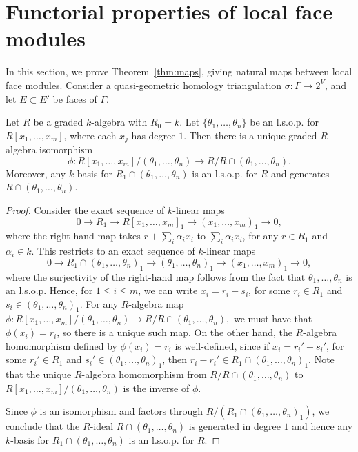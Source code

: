 \documentclass[ALCO, Unicode,published]{cedram}
\begin{document}
\section{Functorial properties of local face modules}

In this section, we prove Theorem~\ref{thm:maps}, giving natural maps between local face modules.  
Consider a quasi-geometric homology triangulation $\sigma\colon \Gamma \to 2^V$, and let $E \subset E'$ be faces of $\Gamma$.




\begin{lemma}\label{lemma:lsop}
Let $R$ be a graded $k$-algebra with $R_0 = k$. Let $\{ \theta_1, \dotsc, \theta_n \}$ be an l.s.o.p. for $R[x_1, \dotsc, x_m]$, where each $x_j$ has  degree $1$. Then there is a unique graded $R$-algebra isomorphism 
\[
\phi \colon R[x_1, \dotsc, x_m]/(\theta_1, \dotsc, \theta_n) \rightarrow R/R \cap (\theta_1, \dotsc, \theta_n).
\]
Moreover, any $k$-basis for $R_1 \cap (\theta_1, \dotsc, \theta_n)$ is an l.s.o.p. for $R$ and generates $R \cap (\theta_1, \dotsc, \theta_n)$.  
\end{lemma}

\begin{proof}
Consider the exact sequence of $k$-linear maps
\[
0 \rightarrow R_1 \rightarrow R[x_1, \dotsc, x_m]_1 \rightarrow (x_1,\dotsc, x_m)_1 \rightarrow 0,
\]
where the right hand map takes $r + \sum_i \alpha_i x_i$ to $\sum_i \alpha_i x_i$, for any $r \in R_1$ and $\alpha_i \in k$. This restricts to an exact sequence of $k$-linear maps
\[
0 \rightarrow R_1 \cap (\theta_1, \dotsc, \theta_n)_1 \rightarrow (\theta_1, \dotsc, \theta_n)_1 \rightarrow (x_1,\dotsc, x_m)_1 \rightarrow 0,
\]
where the surjectivity of the right-hand map follows from the fact that $\theta_1, \dotsc, \theta_n$ is an l.s.o.p. Hence, for $1 \le i \le m$, we can write $x_i = r_i + s_i$, for some $r_i \in R_1$ and $s_i \in (\theta_1, \dotsc, \theta_n)_1$. For any $R$-algebra map $\phi \colon R[x_1, \dotsc, x_m]/(\theta_1, \dotsc, \theta_n) \rightarrow R/R \cap (\theta_1, \dotsc, \theta_n),$ we must have that $\phi(x_i) = r_i$, so there is a unique such map. On the other hand, the $R$-algebra homomorphism defined by $\phi(x_i) = r_i$ is well-defined, since if $x_i = r_i' + s_i'$, for some $r_i' \in R_1$ and $s_i' \in (\theta_1, \dotsc, \theta_n)_1$, then $r_i - r_i' \in R_1 \cap (\theta_1, \dotsc, \theta_n)_1$. Note that the unique $R$-algebra homomorphism from $R/R \cap (\theta_1, \dotsc, \theta_n)$ to  $R[x_1, \dotsc, x_m]/(\theta_1, \dotsc, \theta_n)$ is the inverse of $\phi$.

Since $\phi$ is an isomorphism and factors through $R/(R_1 \cap (\theta_1, \dotsc, \theta_n)_1)$, we conclude that the $R$-ideal $R \cap (\theta_1, \dotsc, \theta_n)$ is generated in degree $1$ and hence any $k$-basis for $R_1 \cap (\theta_1, \dotsc, \theta_n)$ is an l.s.o.p. for $R$.
\end{proof}
\end{document}
